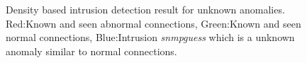 \begin{figure}[htb2]
\begin{center}
\end{center}
\caption{Density based intrusion detection result for unknown anomalies.  Red:Known and seen abnormal connections, Green:Known and seen normal connections, Blue:Intrusion \textit{snmpguess} which is a unknown anomaly similar to normal connections.} %
\label{fig:refSingleRobot1}
\end{figure}

